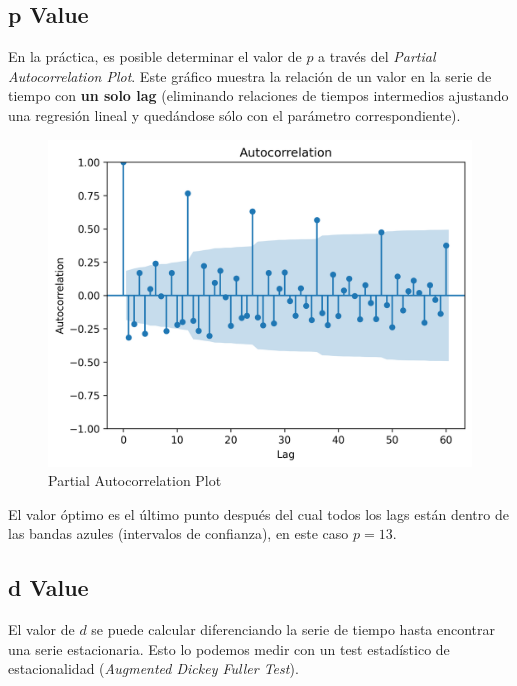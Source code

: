 \subsection{p Value}

En la práctica, es posible determinar el valor de $p$ a través del \textit{Partial Autocorrelation Plot}. Este gráfico muestra la relación de un valor en la serie de tiempo con \textbf{un solo lag} (eliminando relaciones de tiempos intermedios ajustando una regresión lineal y quedándose sólo con el parámetro correspondiente).
\begin{figure}[H]
    \center
    \includegraphics[scale=0.5]{notebooks/TS/img/partial_autocorrelation.png}
    \caption{Partial Autocorrelation Plot}
\end{figure}
El valor óptimo es el último punto después del cual todos los lags están dentro de las bandas azules (intervalos de confianza), en este caso $p=13$. 

\subsection{d Value}

El valor de $d$ se puede calcular diferenciando la serie de tiempo hasta encontrar una serie estacionaria. Esto lo podemos medir con un test estadístico de estacionalidad (\textit{Augmented Dickey Fuller Test}).


